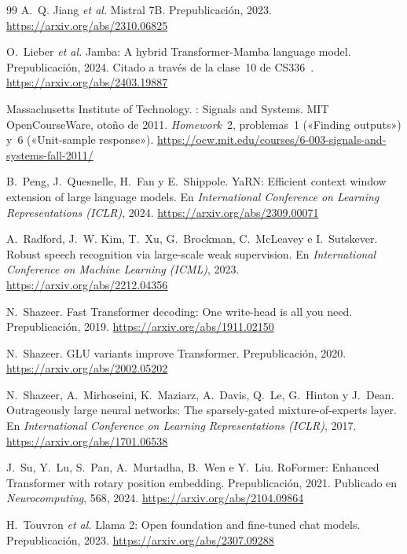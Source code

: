 \begin{thebibliography}{99}
A.~Q. Jiang \emph{et al.}
\newblock Mistral 7B.
\newblock Prepublicación, 2023.
\newblock \url{https://arxiv.org/abs/2310.06825}

O.~Lieber \emph{et al.}
\newblock Jamba: A hybrid Transformer-Mamba language model.
\newblock Prepublicación, 2024. Citado a través de la clase~10 de CS336~\cite{cs336}.
\newblock \url{https://arxiv.org/abs/2403.19887}

Massachusetts Institute of Technology.
: Signals and Systems.
\newblock MIT OpenCourseWare, otoño de 2011. \emph{Homework}~2, problemas~1 («Finding outputs») y~6 («Unit-sample response»).
\newblock \url{https://ocw.mit.edu/courses/6-003-signals-and-systems-fall-2011/}

B.~Peng, J.~Quesnelle, H.~Fan y E.~Shippole.
\newblock YaRN: Efficient context window extension of large language models.
\newblock En \emph{International Conference on Learning Representations (ICLR)}, 2024.
\newblock \url{https://arxiv.org/abs/2309.00071}

A.~Radford, J.~W. Kim, T.~Xu, G.~Brockman, C.~McLeavey e I.~Sutskever.
\newblock Robust speech recognition via large-scale weak supervision.
\newblock En \emph{International Conference on Machine Learning (ICML)}, 2023.
\newblock \url{https://arxiv.org/abs/2212.04356}

N.~Shazeer.
\newblock Fast Transformer decoding: One write-head is all you need.
\newblock Prepublicación, 2019.
\newblock \url{https://arxiv.org/abs/1911.02150}

N.~Shazeer.
\newblock GLU variants improve Transformer.
\newblock Prepublicación, 2020.
\newblock \url{https://arxiv.org/abs/2002.05202}

N.~Shazeer, A.~Mirhoseini, K.~Maziarz, A.~Davis, Q.~Le, G.~Hinton y J.~Dean.
\newblock Outrageously large neural networks: The sparsely-gated mixture-of-experts layer.
\newblock En \emph{International Conference on Learning Representations (ICLR)}, 2017.
\newblock \url{https://arxiv.org/abs/1701.06538}

J.~Su, Y.~Lu, S.~Pan, A.~Murtadha, B.~Wen e Y.~Liu.
\newblock RoFormer: Enhanced Transformer with rotary position embedding.
\newblock Prepublicación, 2021. Publicado en \emph{Neurocomputing}, 568, 2024.
\newblock \url{https://arxiv.org/abs/2104.09864}

H.~Touvron \emph{et al.}
\newblock Llama 2: Open foundation and fine-tuned chat models.
\newblock Prepublicación, 2023.
\newblock \url{https://arxiv.org/abs/2307.09288}


\end{thebibliography}
